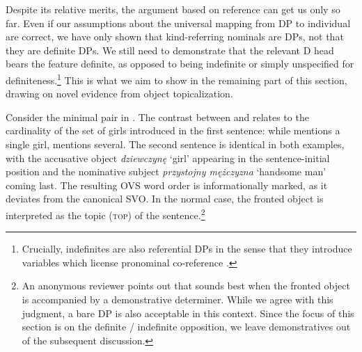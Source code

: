 \documentclass[output=paper]{langscibook}
\begin{document}
\ea {}
\label{ex:bookshelf_1}

 \label{ex:bookshelf_2}
\z \z

\noindent
Despite its relative merits, the argument based on reference can get us only so far. Even if our assumptions about the universal mapping from DP to individual are correct, we have only shown that kind-referring nominals are DPs, not that they are definite DPs. We still need to demonstrate that the relevant D head bears the feature definite, as opposed to being indefinite or simply unspecified for definiteness.\footnote{Crucially, indefinites are also referential DPs in the sense that they introduce variables which license pronominal co-reference \citep{Heim1982, Kamp.Reyle1993}.} This is what we aim to show in the remaining part of this section, drawing on novel evidence from object topicalization.

Consider the minimal pair in . The contrast between  and  relates to the cardinality of the set of girls introduced in the first sentence: while  mentions a single girl,  mentions several. The second sentence is identical in both examples, with the accusative object \textit{dziewczynę} `girl' appearing in the sentence-initial position and the nominative subject \textit{przystojny mężczyzna} `handsome man' coming last. The resulting OVS word order is informationally marked, as it deviates from the canonical  SVO. In the normal case, the fronted object is interpreted as the topic (\textsc{top}) of the sentence.\footnote{An anonymous reviewer points out that  sounds best when the fronted object is accompanied by a demonstrative determiner. While we agree with this judgment, a bare DP is also acceptable in this context. Since the focus of this section is on the definite / indefinite opposition, we leave demonstratives out of the subsequent discussion.}
\end{document}
